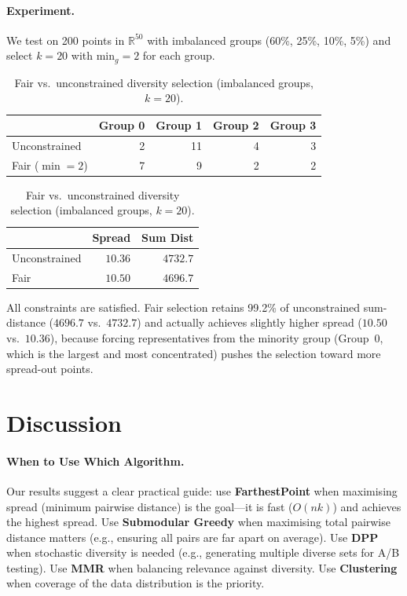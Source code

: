\documentclass[11pt]{article}
\begin{document}
\paragraph{Experiment.}
We test on 200 points in $\mathbb{R}^{50}$ with imbalanced groups
(60\%, 25\%, 10\%, 5\%) and select $k=20$ with $\text{min}_g = 2$
for each group.

\begin{table}[t]
\centering
\small
\caption{Fair vs.\ unconstrained diversity selection
(imbalanced groups, $k=20$).}
\label{tab:fair}
\begin{tabular}{lrrrr}
\toprule
 & Group 0 & Group 1 & Group 2 & Group 3 \\
\midrule
Unconstrained & 2 & 11 & 4 & 3 \\
Fair ($\min\!=\!2$) & 7 & 9 & 2 & 2 \\
\bottomrule
\end{tabular}

\medskip

\begin{tabular}{lrr}
\toprule
 & Spread & Sum Dist \\
\midrule
Unconstrained & $10.36$ & $4732.7$ \\
Fair & $10.50$ & $4696.7$ \\
\bottomrule
\end{tabular}
\end{table}

All constraints are satisfied. Fair selection retains 99.2\% of
unconstrained sum-distance ($4696.7$ vs.\ $4732.7$) and actually
achieves slightly higher spread ($10.50$ vs.\ $10.36$), because
forcing representatives from the minority group (Group~0, which
is the largest and most concentrated) pushes the selection toward
more spread-out points.

\section{Discussion}
\label{sec:discussion}

\paragraph{When to Use Which Algorithm.}
Our results suggest a clear practical guide:
use \textbf{FarthestPoint} when maximising spread (minimum pairwise
distance) is the goal---it is fast ($O(nk)$) and achieves the
highest spread.
Use \textbf{Submodular Greedy} when maximising total pairwise
distance matters (e.g., ensuring all pairs are far apart on average).
Use \textbf{DPP} when stochastic diversity is needed (e.g., generating
multiple diverse sets for A/B testing).
Use \textbf{MMR} when balancing relevance against diversity.
Use \textbf{Clustering} when coverage of the data distribution
is the priority.
\end{document}
